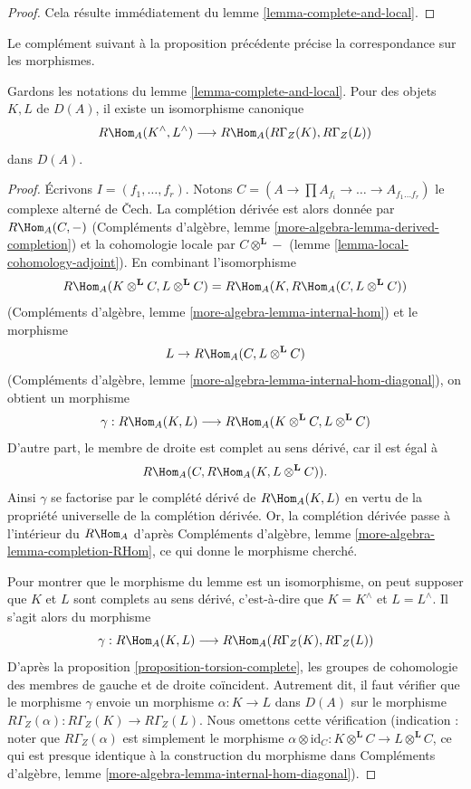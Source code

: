 \begin{proof}
Cela résulte immédiatement du lemme \ref{lemma-complete-and-local}.
\end{proof}

\noindent
Le complément suivant à la proposition précédente précise
la correspondance sur les morphismes.

\begin{lemma}
\label{lemma-compare-RHom}
Gardons les notations du lemme \ref{lemma-complete-and-local}.
Pour des objets $K, L$ de $D(A)$, il existe un isomorphisme canonique
$$
R\Hom_A(K^\wedge, L^\wedge) \longrightarrow R\Hom_A(R\Gamma_Z(K), R\Gamma_Z(L))
$$
dans $D(A)$.
\end{lemma}

\begin{proof}
Écrivons $I = (f_1, \ldots, f_r)$. Notons $C = (A \to \prod A_{f_i} \to \ldots \to A_{f_1 \ldots f_r})$ le complexe alterné de
{\v C}ech. La complétion dérivée est alors donnée par
$R\Hom_A(C, -)$ (Compléments d'algèbre, lemme \ref{more-algebra-lemma-derived-completion})
et la cohomologie locale par $C \otimes^\mathbf{L} -$ (lemme \ref{lemma-local-cohomology-adjoint}).
En combinant l'isomorphisme
$$
R\Hom_A(K \otimes^\mathbf{L} C, L \otimes^\mathbf{L} C) =
R\Hom_A(K, R\Hom_A(C,  L \otimes^\mathbf{L} C))
$$
(Compléments d'algèbre, lemme \ref{more-algebra-lemma-internal-hom})
et le morphisme
$$
L \to R\Hom_A(C,  L \otimes^\mathbf{L} C)
$$
(Compléments d'algèbre, lemme \ref{more-algebra-lemma-internal-hom-diagonal}), on obtient un morphisme
$$
\gamma :
R\Hom_A(K, L)
\longrightarrow
R\Hom_A(K \otimes^\mathbf{L} C, L \otimes^\mathbf{L} C)
$$
D'autre part, le membre de droite est complet au sens dérivé,
car il est égal à
$$
R\Hom_A(C, R\Hom_A(K, L \otimes^\mathbf{L} C)).
$$
Ainsi $\gamma$ se factorise par le complété dérivé de $R\Hom_A(K, L)$
en vertu de la propriété universelle de la complétion dérivée.
Or, la complétion dérivée passe à l'intérieur du $R\Hom_A$
d'après Compléments d'algèbre, lemme \ref{more-algebra-lemma-completion-RHom},
ce qui donne le morphisme cherché.

\medskip\noindent
Pour montrer que le morphisme du lemme est un isomorphisme,
on peut supposer que $K$ et $L$ sont complets au sens dérivé,
c'est-à-dire que $K = K^\wedge$ et $L = L^\wedge$. Il s'agit alors du morphisme
$$
\gamma : R\Hom_A(K, L) \longrightarrow R\Hom_A(R\Gamma_Z(K), R\Gamma_Z(L))
$$
D'après la proposition \ref{proposition-torsion-complete}, les groupes de cohomologie
des membres de gauche et de droite coïncident.
Autrement dit, il faut vérifier que le morphisme $\gamma$
envoie un morphisme $\alpha : K \to L$ dans $D(A)$ sur le morphisme
$R\Gamma_Z(\alpha) : R\Gamma_Z(K) \to R\Gamma_Z(L)$.
Nous omettons cette vérification (indication : noter que $R\Gamma_Z(\alpha)$
est simplement le morphisme $\alpha \otimes \text{id}_C :
K \otimes^\mathbf{L} C
\to
L \otimes^\mathbf{L} C$, ce qui est presque identique
à la construction du morphisme dans Compléments d'algèbre, lemme \ref{more-algebra-lemma-internal-hom-diagonal}).
\end{proof}

